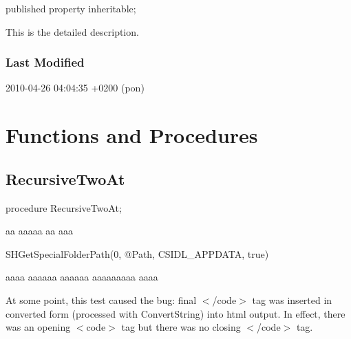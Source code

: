 \documentclass{report}
\begin{document}
\begin{list}{}{
\setlength{\itemindent}{0cm}
\setlength{\listparindent}{0cm}
\setlength{\leftmargin}{\evensidemargin}
\addtolength{\leftmargin}{\tmplength}
\settowidth{\labelsep}{X}
\addtolength{\leftmargin}{\labelsep}
\setlength{\labelwidth}{\tmplength}
}
\begin{flushleft}
\item[\textbf{Declaration}\hfill]
\begin{ttfamily}
published property inheritable;\end{ttfamily}


\end{flushleft}
\par
\item[\textbf{Description}]
This is the detailed description.

\end{list}
\subsubsection*{\large{\textbf{Last Modified}}\normalsize\hspace{1ex}\hfill}
\par
2010-04-26 04:04:35 +0200 (pon)


\section{Functions and Procedures}
\subsection*{RecursiveTwoAt}
\begin{list}{}{
\setlength{\itemindent}{0cm}
\setlength{\listparindent}{0cm}
\setlength{\leftmargin}{\evensidemargin}
\addtolength{\leftmargin}{\tmplength}
\settowidth{\labelsep}{X}
\addtolength{\leftmargin}{\labelsep}
\setlength{\labelwidth}{\tmplength}
}
\begin{flushleft}
\item[\textbf{Declaration}\hfill]
\begin{ttfamily}
procedure RecursiveTwoAt;\end{ttfamily}


\end{flushleft}
\par
\item[\textbf{Description}]
aa aaaaa aa aaa \begin{ttfamily}SHGetSpecialFolderPath(0, @Path, CSIDL{\_}APPDATA, true)\end{ttfamily} aaaa aaaaaa aaaaaa aaaaaaaaa aaaa

At some point, this test caused the bug: final {$<$}/code{$>$} tag was inserted in converted form (processed with ConvertString) into html output. In effect, there was an opening {$<$}code{$>$} tag but there was no closing {$<$}/code{$>$} tag.

\end{list}
\end{document}
